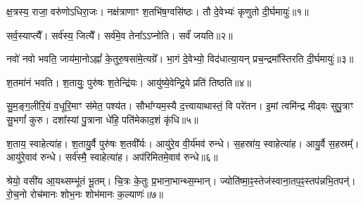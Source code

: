 
क्ष॒त्रस्य॒ राजा॒ वरु॑णोऽधिरा॒जः। नक्ष॑त्राणाꣳ श॒तभि॑ष॒ग्वसि॑ष्ठः। तौ दे॒वेभ्यः॑ कृणुतो दी॒र्घमायुः॑॥१॥

सर्व॒स्याप्त्यै᳚। सर्व॑स्य॒ जित्यै᳚। सर्व॑मे॒व तेना᳚ऽऽप्नोति। सर्वं॑ जयति॥२॥

नवो॑ नवो भवति॒ जाय॑मा॒नोऽह्नां᳚ के॒तुरु॒षसा॑मे॒त्यग्रे᳚।
भा॒गं दे॒वेभ्यो॒ विद॑धात्या॒यन् प्रच॒न्द्रमा᳚स्तिरति दी॒र्घमायुः॑॥३॥

श॒तमा॑नं भवति। श॒तायुः॒ पुरु॑षः श॒तेन्द्रि॑यः। आयु॑ष्ये॒वेन्द्रि॒ये प्रति॑ तिष्ठति॥४॥

सु॒म॒ङ्ग॒लीरि॒यं व॒धूरि॒माꣳ स॑मेत॒ पश्य॑त। 
सौभा᳚ग्यम॒स्यै द॒त्त्वायाथास्तं॒ वि परे॑तन। 
इ॒मां त्वमि॑न्द्र मीढ्वः सुपु॒त्राꣳ सु॒भगां᳚ कुरु। 
दशा᳚स्यां पु॒त्राना धे॑हि॒ पति॑मेकाद॒शं कृ॑धि॥५॥ 


श॒ताय॒ स्वाहेत्या॑ह। श॒तायु॒र्वै पुरु॑षः श॒तवी᳚र्यः। आयु॑रे॒व वी॒र्य॑मव॑ रुन्धे। स॒हस्रा॑य॒ स्वाहेत्या॑ह। आयु॒र्वै स॒हस्रम्᳚। आयु॑रे॒वाव॑ रुन्धे। सर्व॑स्मै॒ स्वाहेत्या॑ह। अप॑रिमितमे॒वाव॑ रुन्धे॥६॥


श्रेयो॒ वसी॑य आ॒यथ्सम्भू॑तं भू॒तम्। 
चि॒त्रः के॒तुः प्र॒भाना॒भान्थ्स॒म्भान्। 
ज्योति॑ष्मा॒ꣴ॒स्तेज॑स्वाना॒तप॒ꣴ॒स्तप॑न्नभि॒\-तपन्॑। 
रो॒च॒नो रोच॑मानः शोभ॒नः शोभ॑मानः क॒ल्याणः॑॥७॥

